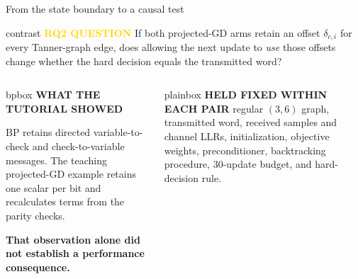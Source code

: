 \documentclass[aspectratio=169,9pt,t]{beamer}
\begin{document}
\begin{frame}{From the state boundary to a causal test}
\begin{beamercolorbox}[rounded=true,sep=.65ex]{contrast}
  \centering\fontsize{7.4}{8.2}\selectfont
  \textcolor{Gold}{\bfseries RQ2 QUESTION}\quad
  If both projected-GD arms retain an offset $\delta_{c,i}$ for every Tanner-graph edge, does allowing the next update to \emph{use} those offsets change whether the hard decision equals the transmitted word?
\end{beamercolorbox}
\vspace{.8mm}

\begin{columns}[T,onlytextwidth]
  \begin{beamercolorbox}[rounded=true,sep=.7ex]{bpbox}
    \fontsize{7}{7.8}\selectfont
    \textcolor{BP}{\bfseries WHAT THE TUTORIAL SHOWED}\par\vspace{.5mm}
    BP retains directed variable-to-check and check-to-variable messages.  The teaching projected-GD example retains one scalar per bit and recalculates terms from the parity checks.\par\vspace{.6mm}
    \textbf{That observation alone did not establish a performance consequence.}
  \end{beamercolorbox}

  \begin{beamercolorbox}[rounded=true,sep=.65ex]{plainbox}
    \fontsize{6.7}{7.5}\selectfont
    \textcolor{Ink}{\bfseries HELD FIXED WITHIN EACH PAIR}\quad
    regular $(3,6)$ graph, transmitted word, received samples and channel LLRs, initialization, objective weights, preconditioner, backtracking procedure, 30-update budget, and hard-decision rule.
  \end{beamercolorbox}
  \vspace{.7mm}
\end{columns}


\end{frame}
\end{document}
